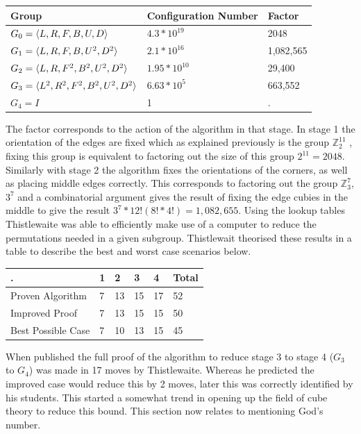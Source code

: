 \documentclass{article}
\DeclarePairedDelimiter{\opair}{\langle}{\rangle}
\newcounter{theo}[section]\setcounter{theo}{0}
\begin{document}
\begin{center}
\label{:thistletab}
    \begin{tabular}{ | p{6cm} | p{4cm}| p{3cm} |}
    \hline
    Group & Configuration Number & Factor \\ \hline
    $G_{0} = \opair{L,R,F,B,U,D}$ & $4.3*10^{19}$ & 2048\\ \hline
    $G_{1} = \opair{L,R,F,B,U^{2},D^{2}}$ &  $2.1*10^{16}$ & 1,082,565\\ \hline
    $G_{2} = \opair{L,R,F^{2},B^{2},U^{2},D^{2}}$& $1.95*10^{10}$ & 29,400 \\ \hline
    $G_{3} = \opair{L^{2},R^{2},F^{2},B^{2},U^{2},D^{2}}$& $6.63*10^{5}$ & 663,552\\ \hline
    $G_{4} = I$& 1 & .\\ \hline
    \end{tabular}
\end{center}
The factor corresponds to the action of the algorithm in that stage. In stage 1 the orientation of the edges are fixed which as explained previously is the group $\mathbb{Z}_{2}^{11}$ , fixing this group is equivalent to factoring out the size of this group $2^{11} = 2048$. Similarly with stage 2 the algorithm fixes the orientations of the corners, as well as placing middle edges correctly. This corresponds to factoring out the group $\mathbb{Z}_{3}^{7}$, $3^7$  and a combinatorial argument gives the result of fixing the edge cubies in the middle to give the result $3^7 * 12!(8!*4!) = 1,082,655$. Using the lookup tables Thistlewaite was able to efficiently make use of a computer to reduce the permutations needed in a given subgroup. Thistlewait theorised these results in a table to describe the best and worst case scenarios below.
\begin{center}
\label{:thistletab}
    \begin{tabular}{ | p{4cm}| p{1.5cm}| p{1.5cm}| p{1.5cm}| p{1.5cm}| p{2cm}|}
    \hline
    . & 1 & 2 & 3 & 4 & Total \\ \hline
    Proven Algorithm & 7 & 13 & 15 & 17 & 52\\ \hline
	Improved Proof & 7 & 13 &15 & 15 & 50\\ \hline
	Best Possible Case & 7 & 10 & 13 & 15 &45\\ \hline
    \end{tabular}
\end{center}
When published the full proof of the algorithm to reduce stage 3 to stage 4 ($G_3$ to $G_4$) was made in 17 moves by Thistlewaite. Whereas he predicted the improved case would reduce this by 2 moves, later this was correctly identified by his students. This started a somewhat trend in opening up the field of cube theory to reduce this bound. This section now relates to mentioning God's number.
\end{document}
